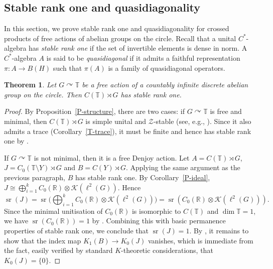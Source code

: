 \documentclass[11pt,a4paper,leqno]{amsart}
\newtheorem{thm}{Theorem}[section]
\theoremstyle{definition}
\theoremstyle{remark}
\numberwithin{equation}{section}
\theoremstyle{plain}
\DeclareMathOperator{\sr}{sr}
\newcommand{\Tb}{\mathbb{T}}
\newcommand{\Rb}{\mathbb{R}}
\newcommand{\Zc}{\mathcal{Z}}
\newcommand{\Kc}{\mathcal{K}}
\begin{document}
\subsection{Stable rank one and quasidiagonality}\label{sec:stable_quasi}

In this section, we prove stable rank one and quasidiagonality for crossed products of free  actions of abelian groups on the circle. Recall that a unital $C^*$-algebra has \emph{stable rank one} if the set of invertible elements is dense in norm. A $C^*$-algebra $A$ is said to be \emph{quasidiagonal} if it admits a faithful representation $\pi : A \to B(H)$ such that $\pi(A)$ is a family of quasidiagonal operators. 

\begin{thm}\label{T-sr}
    Let $G\curvearrowright \Tb$ be a free action of a countably infinite discrete abelian group on the circle. Then $C(\Tb)\rtimes G$ has stable rank one. 
\end{thm}

\begin{proof}
    By Proposition~\ref{P-structure}, there are two cases: if $G\curvearrowright \Tb$ is free and minimal, then $C(\Tb)\rtimes G$ is simple unital and $\Zc$-stable (see, e.g., \cite[Theorem 8.2]{KerSza20}). Since it also admits a trace (Corollary~\ref{T-trace}), it must be finite and hence has stable rank one by \cite[Theorem 6.7]{Ror04}. 
    
    If $G\curvearrowright \Tb$ is not minimal, then it is a free Denjoy action. Let $A = C(\Tb)\rtimes G$, $J = C_0(\Tb\setminus Y)\rtimes G$ and $B = C(Y)\rtimes G$. Applying the same argument as the previous paragraph, $B$ has stable rank one. By Corollary~\ref{P-ideal}, $J \cong \bigoplus_{i=1}^k C_0(\Rb)\otimes \Kc(\ell^2(G))$. Hence 
    \begin{equation}
        \sr(J) = \sr\Big(\bigoplus_{i=1}^k C_0(\Rb)\otimes \Kc(\ell^2(G))\Big) = \sr(C_0(\Rb)\otimes \Kc(\ell^2(G))). \label{sr_calc}
    \end{equation}
    Since the minimal unitisation of $C_0(\Rb)$ is isomorphic to $C(\Tb)$ and $\dim \Tb = 1$, we have $\sr(C_0(\Rb)) = 1$ by \cite[Proposition 1.7]{Rie83}. Combining this with basic permanence properties of stable rank one, we conclude that $\sr(J) = 1$. By \cite[Lemma 3]{Nis87}, it remains to show that the index map $K_1(B) \to K_0(J)$ vanishes, which is immediate from the fact, easily verified by standard $K$-theoretic considerations, that $K_0(J) = \{0\}$.  
\end{proof}
\end{document}
